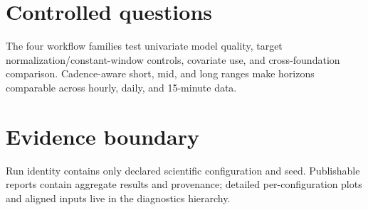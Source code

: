 \documentclass[10pt]{article}
\begin{document}
\section{Controlled questions}
The four workflow families test univariate model quality, target
normalization/constant-window controls, covariate use, and cross-foundation
comparison. Cadence-aware short, mid, and long ranges make horizons comparable
across hourly, daily, and 15-minute data.

\section{Evidence boundary}
Run identity contains only declared scientific configuration and seed.
Publishable reports contain aggregate results and provenance; detailed
per-configuration plots and aligned inputs live in the diagnostics hierarchy.
\end{document}
